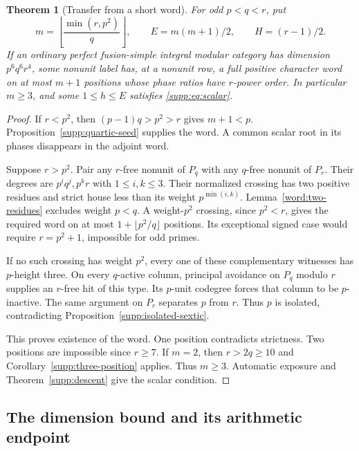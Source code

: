 \documentclass[11pt,a4paper]{article}
\numberwithin{equation}{section}
\newtheorem{theorem}{Theorem}[section]
\begin{document}
\begin{theorem}[Transfer from a short word]\label{supp:transfer}
For odd $p<q<r$, put
\[
 m=\left\lfloor\frac{\min(r,p^2)}q\right\rfloor,
       \qquad E=m(m+1)/2,
       \qquad H=(r-1)/2.
\]
If an ordinary perfect fusion-simple integral modular category
has dimension $p^6q^6r^4$, some nonunit label has, at a nonunit
row, a full positive character word on at most $m+1$ positions
whose phase ratios have $r$-power order. In particular $m\ge3$, and some
$1\le h\le E$ satisfies \eqref{supp:eq:scalar}.
\end{theorem}
\begin{proof}
If $r<p^2$, then $(p-1)q>p^2>r$ gives $m+1<p$.
Proposition~\ref{supp:quartic-seed} supplies the word.
A common scalar root in its phases disappears in the adjoint word.

Suppose $r>p^2$. Pair any $r$-free nonunit of $P_q$
with any $q$-free nonunit of $P_r$. Their degrees are
$p^iq^j,p^kr$ with $1\le i,k\le3$. Their normalized
crossing has two positive residues and strict house
less than its weight $p^{\min(i,k)}$.
Lemma~\ref{word:two-residues} excludes weight $p<q$.
A weight-$p^2$ crossing, since $p^2<r$, gives the
required word on at most $1+\lfloor p^2/q\rfloor$
positions. Its exceptional signed case would require
$r=p^2+1$, impossible for odd primes.

If no such crossing has weight $p^2$, every one of these
complementary witnesses has $p$-height three. On every
$q$-active column, principal avoidance on $P_q$ modulo
$r$ supplies an $r$-free hit of this type. Its $p$-unit
codegree forces that column to be $p$-inactive. The
same argument on $P_r$ separates $p$ from $r$.
Thus $p$ is isolated, contradicting
Proposition~\ref{supp:isolated-sextic}.

This proves existence of the word. One position
contradicts strictness. Two positions are impossible
since $r\ge7$. If $m=2$, then $r>2q\ge10$ and
Corollary~\ref{supp:three-position} applies.
Thus $m\ge3$. Automatic exposure and
Theorem~\ref{supp:descent} give the scalar condition.
\end{proof}

\subsection{The dimension bound and its arithmetic endpoint}
\end{document}
